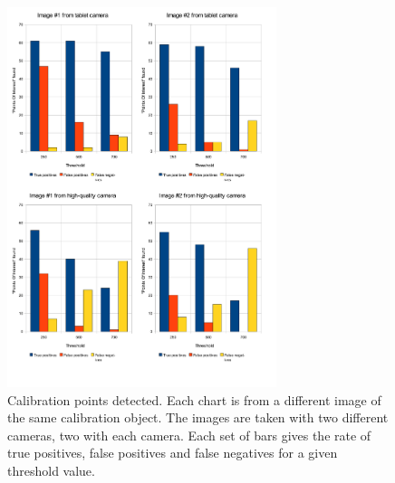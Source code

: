 \begin{figure}[h]
  \centering
  \includegraphics[width=0.7\textwidth]{figures/calibration-auto}
  \caption[Calibration point detection]{Calibration points detected. Each chart is from a different image of
    the same calibration object. The images are taken with two
    different cameras, two with each camera. Each set of bars gives the rate of true positives, false positives and false negatives for a given threshold value.}
  \label{fig:calib-auto}
\end{figure}
